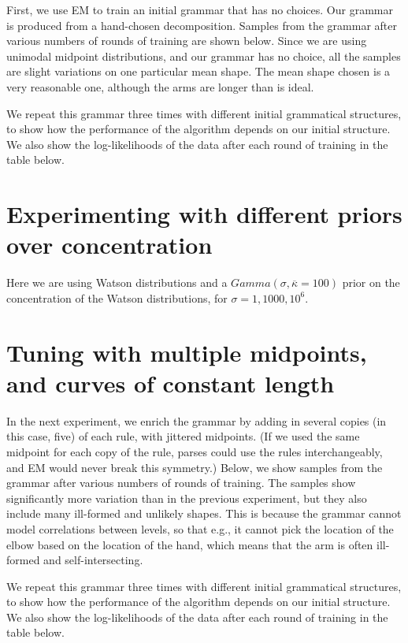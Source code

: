 \documentclass{book}
\begin{document}
First, we use EM to train an initial grammar that has no choices. Our
grammar is produced from a hand-chosen decomposition. Samples from the
grammar after various numbers of rounds of training are shown
below. Since we are using unimodal midpoint distributions, and our
grammar has no choice, all the samples are slight variations on one
particular mean shape. The mean shape chosen is a very reasonable one,
although the arms are longer than is ideal.

We repeat this grammar three times with different initial grammatical
structures, to show how the performance of the algorithm depends on
our initial structure. We also show the log-likelihoods of the data
after each round of training in the table below.



\section{Experimenting with different priors over concentration}

Here we are using Watson distributions and a $Gamma(\sigma,
\overline{\kappa}=100)$ prior on the concentration of the Watson
distributions, for $\sigma=1, 1000, 10^6$.



\section{Tuning with multiple midpoints, and curves of constant length}

In the next experiment, we enrich the grammar by adding in several
copies (in this case, five) of each rule, with jittered midpoints. (If
we used the same midpoint for each copy of the rule, parses could use
the rules interchangeably, and EM would never break this symmetry.)
Below, we show samples from the grammar after various numbers of
rounds of training. The samples show significantly more variation than
in the previous experiment, but they also include many ill-formed and
unlikely shapes. This is because the grammar cannot model correlations
between levels, so that e.g., it cannot pick the location of the elbow
based on the location of the hand, which means that the arm is often
ill-formed and self-intersecting.

We repeat this grammar three times with different initial grammatical
structures, to show how the performance of the algorithm depends on
our initial structure. We also show the log-likelihoods of the data
after each round of training in the table below.
\end{document}
